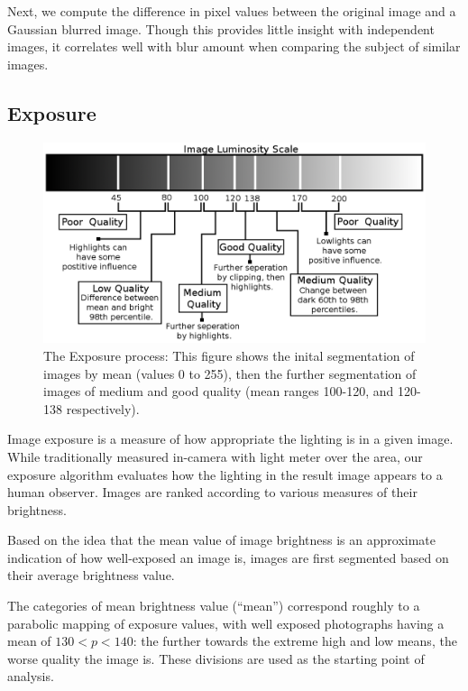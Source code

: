 \documentclass{article}
\begin{document}
Next, we compute the difference in pixel values between the original image and a Gaussian blurred image. Though this provides little insight with independent images, it correlates well with blur amount when comparing the subject of similar images.

\subsection{Exposure}
\begin{figure}
  \centering
    \includegraphics[scale=0.53,clip]{imageluminosity.eps}
    \caption{The Exposure process: This figure shows the inital segmentation of images by mean (values 0 to 255), then the further segmentation of images of medium and good quality (mean ranges 100-120, and 120-138 respectively).}
    \label{exposurefigure}
\end{figure}
Image exposure is a measure of how appropriate the lighting is in a given image.  While traditionally measured in-camera with light meter over the area, our exposure algorithm evaluates how the lighting in the result image appears to a human observer.  Images are ranked according to various measures of their brightness. %

Based on the idea that the mean value of image brightness is an approximate indication of how well-exposed an image is, images are first segmented based on their average brightness value.

The categories of mean brightness value (“mean”) correspond roughly to a parabolic mapping of exposure values, with well exposed photographs having a mean of \(130<p<140\): the further towards the extreme high and low means, the worse quality the image is. These divisions are used as the starting point of analysis. %
\end{document}
